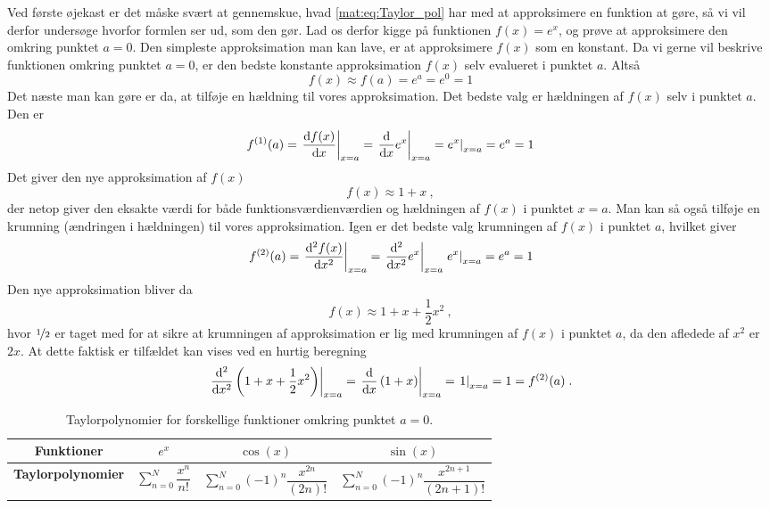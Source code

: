 %
Ved første øjekast er det måske svært at gennemskue, hvad \cref{mat:eq:Taylor_pol} har med at approksimere en funktion at gøre, så vi vil derfor undersøge hvorfor formlen ser ud, som den gør. Lad os derfor kigge på funktionen $f(x) = e^x$, og prøve at approksimere den omkring punktet $a = 0$. Den simpleste approksimation man kan lave, er at approksimere $f(x)$ som en konstant. Da vi gerne vil beskrive funktionen omkring punktet $a=0$, er den bedste konstante approksimation $f(x)$ selv evalueret i punktet $a$. Altså
$$f(x) \approx f(a) = e^a = e^0 = 1$$
Det næste man kan gøre er da, at tilføje en hældning til vores approksimation. Det bedste valg er hældningen af $f(x)$ selv i punktet $a$. Den er
$$f^{(1)}(a) = \left. \dv{f(x)}{x} \right|_{x=a} = \left. \dv{}{x}e^x \right|_{x=a} \left. = e^x \right|_{x=a} = e^a = 1$$
Det giver den nye approksimation af $f(x)$
$$f(x) \approx 1 + x \ ,$$
der netop giver den eksakte værdi for både funktionsværdienværdien og hældningen af $f(x)$ i punktet $x=a$. Man kan så også tilføje en krumning (ændringen i hældningen) til vores approksimation. Igen er det bedste valg krumningen af $f(x)$ i punktet $a$, hvilket giver
$$f^{(2)}(a) = \left. \dv[2]{f(x)}{x} \right|_{x=a} = \left. \dv[2]{}{x} e^x \right|_{x=a} \left. e^x \right|_{x=a} = e^a = 1$$
Den nye approksimation bliver da
$$f(x) \approx 1 +  x + \frac{1}{2} x^2 \ ,$$
hvor $\nicefrac{1}{2}$ er taget med for at sikre at krumningen af approksimation er lig med krumningen af $f(x)$ i punktet $a$, da den afledede af $x^2$ er $2x$. At dette faktisk er tilfældet kan vises ved en hurtig beregning
%
\begin{equation*}
\left. \dv[2]{}{x} \left(1+x+\frac{1}{2}x^2\right) \right|_{x=a} = \left. \dv{}{x} \left(1+x\right) \right|_{x=a} = \left. 1 \right|_{x=a} = 1 = f^{(2)}(a) \; .
\end{equation*}
%
\begin{table}[t]
	\centering
	\caption{Taylorpolynomier for forskellige funktioner omkring punktet $a=0$.}
	\label{mat:tab:Taylorseries_table}
	\bgroup
	\def\arraystretch{2}
	\begin{tabular}{|c|c|c|c|}
		\hline
		\textbf{Funktioner}   & $e^x$ & $\cos(x)$ & $\sin(x)$  \\ 
		\hline
		\textbf{Taylorpolynomier} & $\sum\limits_{n = 0}^{N} \dfrac{x^n}{n!}$ & $\sum\limits_{n=0}^{N} (-1)^n \dfrac{x^{2n}}{(2n)!} $ & $\sum\limits_{n=0}^{N} (-1)^n \dfrac{x^{2n+1}}{(2n+1)!}$  \\ \hline
	\end{tabular}
	\egroup
\end{table}
